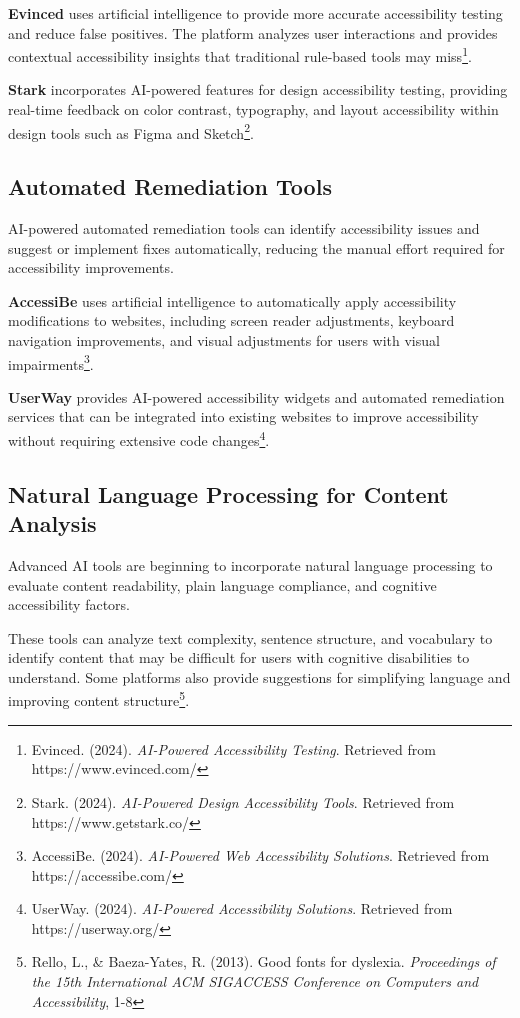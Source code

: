 \textbf{Evinced} uses artificial intelligence to provide more accurate accessibility testing and reduce false positives. The platform analyzes user interactions and provides contextual accessibility insights that traditional rule-based tools may miss\footnote{Evinced. (2024). \textit{AI-Powered Accessibility Testing}. Retrieved from https://www.evinced.com/}.

\textbf{Stark} incorporates AI-powered features for design accessibility testing, providing real-time feedback on color contrast, typography, and layout accessibility within design tools such as Figma and Sketch\footnote{Stark. (2024). \textit{AI-Powered Design Accessibility Tools}. Retrieved from https://www.getstark.co/}.

\subsection{Automated Remediation Tools}

AI-powered automated remediation tools can identify accessibility issues and suggest or implement fixes automatically, reducing the manual effort required for accessibility improvements.

\textbf{AccessiBe} uses artificial intelligence to automatically apply accessibility modifications to websites, including screen reader adjustments, keyboard navigation improvements, and visual adjustments for users with visual impairments\footnote{AccessiBe. (2024). \textit{AI-Powered Web Accessibility Solutions}. Retrieved from https://accessibe.com/}.

\textbf{UserWay} provides AI-powered accessibility widgets and automated remediation services that can be integrated into existing websites to improve accessibility without requiring extensive code changes\footnote{UserWay. (2024). \textit{AI-Powered Accessibility Solutions}. Retrieved from https://userway.org/}.

\subsection{Natural Language Processing for Content Analysis}

Advanced AI tools are beginning to incorporate natural language processing to evaluate content readability, plain language compliance, and cognitive accessibility factors.

These tools can analyze text complexity, sentence structure, and vocabulary to identify content that may be difficult for users with cognitive disabilities to understand. Some platforms also provide suggestions for simplifying language and improving content structure\footnote{Rello, L., \& Baeza-Yates, R. (2013). Good fonts for dyslexia. \textit{Proceedings of the 15th International ACM SIGACCESS Conference on Computers and Accessibility}, 1-8}.

